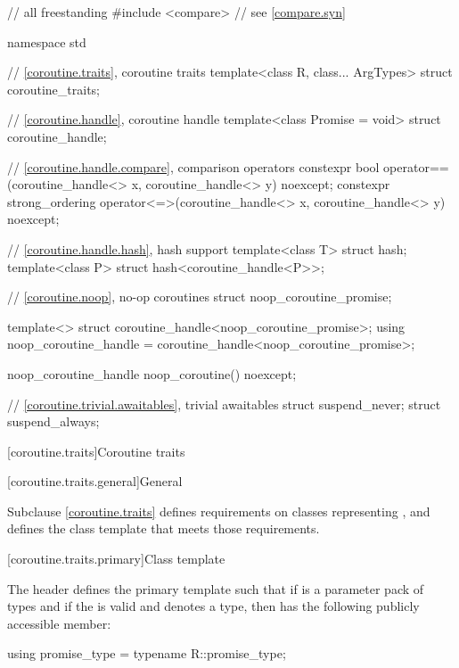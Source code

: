 %
%
\begin{codeblock}
// all freestanding
#include <compare>              // see \ref{compare.syn}

namespace std {
  // \ref{coroutine.traits}, coroutine traits
  template<class R, class... ArgTypes>
    struct coroutine_traits;

  // \ref{coroutine.handle}, coroutine handle
  template<class Promise = void>
    struct coroutine_handle;

  // \ref{coroutine.handle.compare}, comparison operators
  constexpr bool operator==(coroutine_handle<> x, coroutine_handle<> y) noexcept;
  constexpr strong_ordering operator<=>(coroutine_handle<> x, coroutine_handle<> y) noexcept;

  // \ref{coroutine.handle.hash}, hash support
  template<class T> struct hash;
  template<class P> struct hash<coroutine_handle<P>>;

  // \ref{coroutine.noop}, no-op coroutines
  struct noop_coroutine_promise;

  template<> struct coroutine_handle<noop_coroutine_promise>;
  using noop_coroutine_handle = coroutine_handle<noop_coroutine_promise>;

  noop_coroutine_handle noop_coroutine() noexcept;

  // \ref{coroutine.trivial.awaitables}, trivial awaitables
  struct suspend_never;
  struct suspend_always;
}
\end{codeblock}

[coroutine.traits]{Coroutine traits}

[coroutine.traits.general]{General}

\pnum
Subclause \ref{coroutine.traits} defines requirements on classes representing
,
and defines the class template
that meets those requirements.

[coroutine.traits.primary]{Class template }

%
\pnum
The header  defines the primary template
 such that
if  is a parameter pack of types and
if the   is valid and
denotes a type,
then  has the following publicly
accessible member:

\begin{codeblock}
using promise_type = typename R::promise_type;
\end{codeblock}

